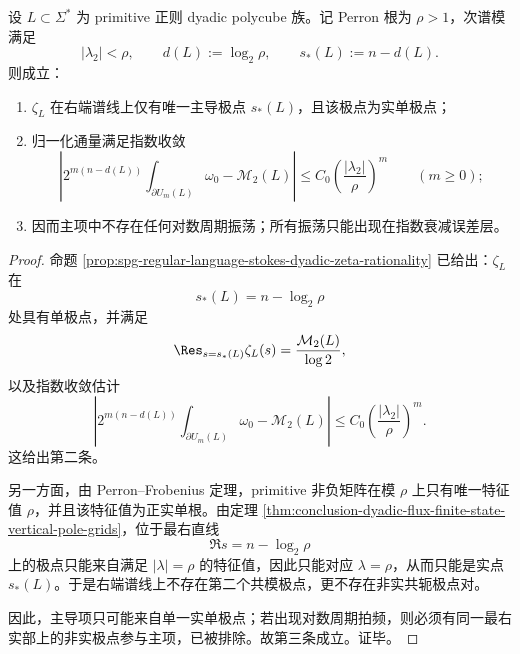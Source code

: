 \begin{theorem}\label{thm:conclusion-dyadic-flux-primitive-no-leading-logperiodic}
设 \(L\subset \Sigma^\ast\) 为 primitive 正则 dyadic polycube 族。记 Perron 根为 \(\rho>1\)，次谱模满足
\[
|\lambda_2|<\rho,
\qquad
d(L):=\log_2\rho,
\qquad
s_\ast(L):=n-d(L).
\]
则成立：
\begin{enumerate}
  \item \(\zeta_L\) 在右端谱线上仅有唯一主导极点 \(s_\ast(L)\)，且该极点为实单极点；
  \item 归一化通量满足指数收敛
  \[
  \left|
  2^{m(n-d(L))}\int_{\partial U_m(L)}\omega_0-\mathcal M_2(L)
  \right|
  \le
  C_0\left(\frac{|\lambda_2|}{\rho}\right)^m
  \qquad(m\ge 0);
  \]
  \item 因而主项中不存在任何对数周期振荡；所有振荡只能出现在指数衰减误差层。
\end{enumerate}
\end{theorem}
\begin{proof}
命题 \ref{prop:spg-regular-language-stokes-dyadic-zeta-rationality} 已给出：\(\zeta_L\) 在
\[
s_\ast(L)=n-\log_2\rho
\]
处具有单极点，并满足
\[
\Res_{s=s_\ast(L)}\zeta_L(s)=\frac{\mathcal M_2(L)}{\log 2},
\]
以及指数收敛估计
\[
\left|
2^{m(n-d(L))}\int_{\partial U_m(L)}\omega_0-\mathcal M_2(L)
\right|
\le
C_0\left(\frac{|\lambda_2|}{\rho}\right)^m.
\]
这给出第二条。

另一方面，由 Perron--Frobenius 定理，primitive 非负矩阵在模 \(\rho\) 上只有唯一特征值 \(\rho\)，并且该特征值为正实单根。由定理 \ref{thm:conclusion-dyadic-flux-finite-state-vertical-pole-grids}，位于最右直线
\[
\Re s=n-\log_2\rho
\]
上的极点只能来自满足 \(|\lambda|=\rho\) 的特征值，因此只能对应 \(\lambda=\rho\)，从而只能是实点 \(s_\ast(L)\)。于是右端谱线上不存在第二个共模极点，更不存在非实共轭极点对。

因此，主导项只可能来自单一实单极点；若出现对数周期拍频，则必须有同一最右实部上的非实极点参与主项，已被排除。故第三条成立。证毕。
\end{proof}


